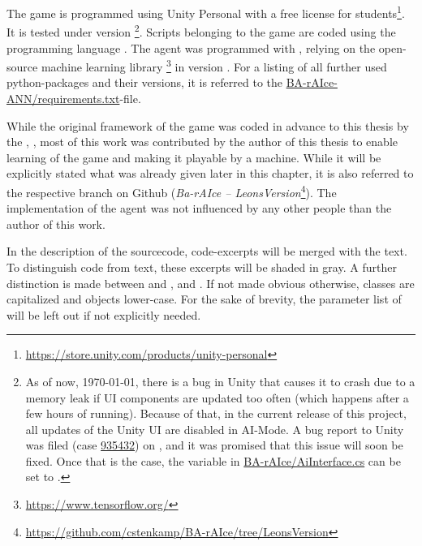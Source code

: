 The game is programmed using Unity Personal with a free license for students\footnote{\url{https://store.unity.com/products/unity-personal}}. It is tested under version \footnote{As of now, \today, there is a bug in Unity that causes it to crash due to a memory leak if UI components are updated too often (which happens after a few hours of running). Because of that, in the current release of this project, all updates of the Unity UI are disabled in AI-Mode. A bug report to Unity was filed (case \href{https://fogbugz.unity3d.com/default.asp?935432_h1bir10rkmbc658k}{935432}) on , and it was promised that this issue will soon be fixed. Once that is the case, the variable  in \href{https://github.com/cstenkamp/BA-rAIce/blob/ef2dc018f36cd9ad65df90e65d8ab840c822567e/Assets/Scripts/AiInterface.cs\#L12-L13}{BA-rAIce/AiInterface.cs} can be set to .}.
Scripts belonging to the game are coded using the programming language . The agent was programmed with , relying on the open-source machine learning library \cite{abadi_tensorflow:_2015}\footnote{\url{https://www.tensorflow.org/}} in version . For a listing of all further used python-packages and their versions, it is referred to the \href{https://github.com/cstenkamp/BA-rAIce-ANN/blob/master/requirements.txt}{BA-rAIce-ANN/requirements.txt}-file. 

While the original framework of the game was coded in advance to this thesis by the \leonbase, , most of this work was contributed by the author of this thesis to enable learning of the game and making it playable by a machine. While it will be explicitly stated what was already given later in this chapter, it is also referred to the respective branch on Github (\textit{Ba-rAIce -- LeonsVersion}\footnote{\url{https://github.com/cstenkamp/BA-rAIce/tree/LeonsVersion}}). The implementation of the agent was not influenced by any other people than the author of this work.

In the description of the sourcecode, code-excerpts will be merged with the text. To distinguish code from text, these excerpts will be shaded in gray. A further distinction is made between  and ,  and . If not made obvious otherwise, classes are capitalized and objects lower-case. For the sake of brevity, the parameter list of  will be left out if not explicitly needed.\\

